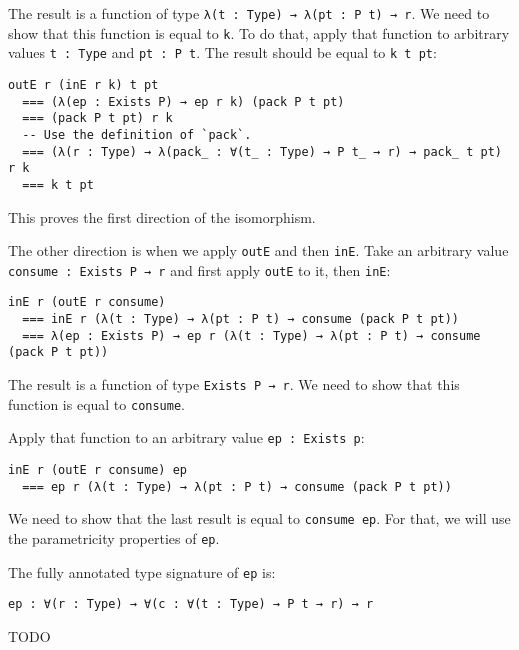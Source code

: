 The result is a function of type \lstinline!λ(t : Type) → λ(pt : P t) → r!.
We need to show that this function is equal to \lstinline!k!.
To do that, apply that function to arbitrary values \lstinline!t : Type! and \lstinline!pt : P t!.
The result should be equal to \lstinline!k t pt!:


\begin{lstlisting}[language=Dhall]
outE r (inE r k) t pt
  === (λ(ep : Exists P) → ep r k) (pack P t pt)
  === (pack P t pt) r k
  -- Use the definition of `pack`.
  === (λ(r : Type) → λ(pack_ : ∀(t_ : Type) → P t_ → r) → pack_ t pt) r k
  === k t pt
\end{lstlisting}


This proves the first direction of the isomorphism.


The other direction is when we apply \lstinline!outE! and then \lstinline!inE!.
Take an arbitrary value \lstinline!consume : Exists P → r! and first apply \lstinline!outE! to it, then \lstinline!inE!:


\begin{lstlisting}[language=Dhall]
inE r (outE r consume)
  === inE r (λ(t : Type) → λ(pt : P t) → consume (pack P t pt))
  === λ(ep : Exists P) → ep r (λ(t : Type) → λ(pt : P t) → consume (pack P t pt))
\end{lstlisting}


The result is a function of type \lstinline!Exists P → r!.
We need to show that this function is equal to \lstinline!consume!.


Apply that function to an arbitrary value \lstinline!ep : Exists p!:


\begin{lstlisting}[language=Dhall]
inE r (outE r consume) ep
  === ep r (λ(t : Type) → λ(pt : P t) → consume (pack P t pt))
\end{lstlisting}


We  need to show that the last result is equal to \lstinline!consume ep!.
For that, we will use the parametricity properties of \lstinline!ep!.


The fully annotated type signature of \lstinline!ep! is:


\begin{lstlisting}[language=Dhall]
ep : ∀(r : Type) → ∀(c : ∀(t : Type) → P t → r) → r
\end{lstlisting}


TODO
